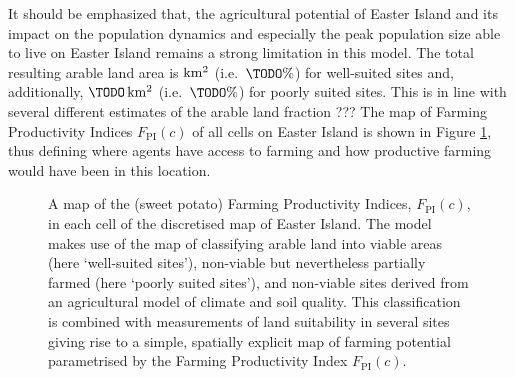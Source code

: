 It should be emphasized that, the agricultural potential of Easter Island and its impact on the population dynamics and especially the peak population size able to live on Easter Island remains a strong limitation in this model. %
The total resulting arable land area is \TODO $\rm{km^2}$ (i.e.\ $\TODO\%$) for well-suited sites and, additionally, $\TODO\, \rm{km^2}$ (i.e.\ $\TODO\%$) for poorly suited sites.
This is in line with several different estimates of the arable land fraction \TODO \citet{Bahn2017}???
The map of Farming Productivity Indices $F_\text{PI}(c)$ of all cells on Easter Island is shown in Figure \ref{fig:Map_agric}, thus defining where agents have access to farming and how productive farming would have been in this location. 

\begin{figure}
	\centering
	\caption{A map of the (sweet potato) Farming Productivity Indices, $F_\text{PI}(c)$, in each cell of the discretised map of Easter Island. The model makes use of the map of \citet{Pulestion2017} classifying arable land into viable areas (here `well-suited sites'), non-viable but nevertheless partially farmed (here `poorly suited sites'), and non-viable sites derived from an agricultural model of climate and soil quality. 
	This classification is combined with measurements of land suitability in several sites \citep{Louwagie2006} giving rise to a simple, spatially explicit map of farming potential parametrised by the Farming Productivity Index $F_\text{PI}(c)$.}
	\label{fig:Map_agric}
\end{figure}


